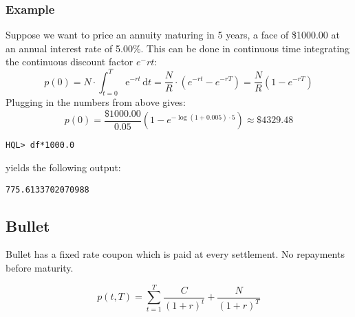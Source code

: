 \documentclass[11pt,a4paper]{article}
\numberwithin{equation}{section}
\begin{document}
\subsubsection{Example}
Suppose we want to price an annuity maturing in 5 years, a face of \$1000.00 at an annual interest rate of 5.00\%.
This can be done in continuous time integrating the continuous discount factor $e^-rt$:
\[
p(0)=N\cdot \int_{t=0}^T \mathrm{e}^{-rt}\,\mathrm{d}t=\frac{N}{R}\cdot (e^{-rt}-e^{-rT})=\frac{N}{R}(1-e^{-rT})
\]
Plugging in the numbers from above gives:
\[
p(0)=\frac{\$1000.00}{0.05}(1-e^{-\log(1+0.005)\cdot 5})\approx \$4329.48
\]
\begin{lstlisting}
HQL> df*1000.0
\end{lstlisting}
yields the following output:
\FrameSep
\begin{lstlisting}[style=Output]
775.6133702070988
\end{lstlisting}

\subsection{Bullet}
Bullet has a fixed rate coupon which is paid at every settlement. No repayments before maturity.

\[ p(t,T) = \sum_{t=1}^{T}\frac{C}{(1+r)^t} + \frac{N}{(1+r)^T} \]
\end{document}
